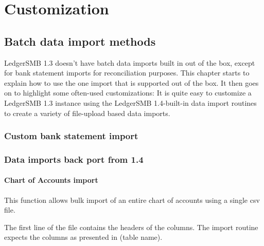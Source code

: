 


\part{Customization}
\label{part-customization}

\chapter{Batch data import methods}
\label{cha-customization-batch-import}

LedgerSMB 1.3 doesn't have batch data imports built in out of the box,
except for bank statement imports for reconciliation purposes. This
chapter starts to explain how to use the one import that is supported
out of the box. It then goes on to highlight some often-used customizations: 
It is quite easy to customize a LedgerSMB 1.3 instance using
the LedgerSMB 1.4-built-in data import routines to create a variety
of file-upload based data imports.

\section{Custom bank statement import}
\label{sec-customization-batch-import-bank-statement}

\section{Data imports back port from 1.4}
\label{sec-customization-import-routines-from-14}

\subsection{Chart of Accounts import}
\label{subsec-customization-import-coa}

This function allows bulk import of an entire chart of accounts using a
single \gls{csv} file.

The first line of the file contains the headers of the columns. The
import routine expects the columns as presented in (table name).

